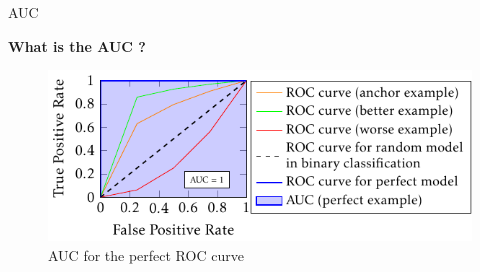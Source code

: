 \begin{frame}{AUC}
    
    {\large\textbf{What is the AUC ?}}

    \begin{figure}
        \centering
        \includegraphics[page=1]{images/output-figure5.pdf}
        \caption{AUC for the perfect ROC curve}
    \end{figure}

                

\end{frame}
